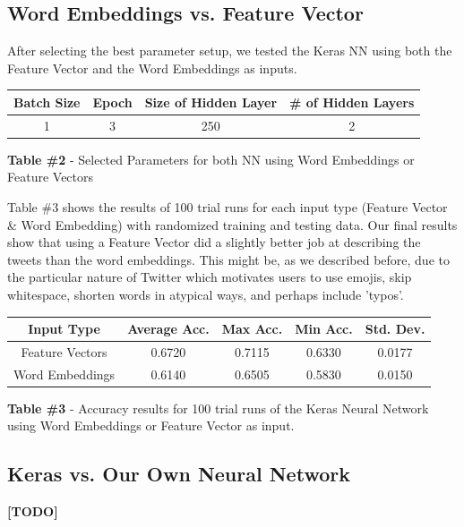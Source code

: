 \documentclass[11pt,onecolumn]{article} %
\begin{document}
\subsection{Word Embeddings vs. Feature Vector}
After selecting the best parameter setup, we tested the Keras NN using both the Feature Vector and the Word Embeddings as inputs. 

\begin{center}
	\begin{tabular}{ | c | c | c | c |}
		\hline
		Batch Size & Epoch & Size of Hidden Layer & \# of Hidden Layers \\
		\hline
		1 & 3 &  250 & 2 \\
		\hline
	\end{tabular}
	\newline
	\newline
	\textbf{Table \#2 } - Selected Parameters for both NN using Word Embeddings or Feature Vectors
\end{center}

\par Table \#3 shows the results of 100 trial runs for each input type (Feature Vector \& Word Embedding) with randomized training and testing data. Our final results show that using a Feature Vector did a slightly better job at describing the tweets than the word embeddings. This might be, as we described before, due to the particular nature of Twitter which motivates users to use emojis, skip whitespace, shorten words in atypical ways, and perhaps include 'typos'. 

\begin{center}
	\begin{tabular}{ | c | c | c | c | c |}
		\hline
		Input Type & Average Acc. & Max Acc. & Min Acc. & Std. Dev. \\
		\hline
		Feature Vectors & 0.6720 & 0.7115 & 0.6330 & 0.0177 \\
		\hline
		Word Embeddings & 0.6140 &	0.6505 & 0.5830 & 0.0150
		\\
		\hline
	\end{tabular}
	\newline
	\newline
	\textbf{Table \#3} - Accuracy results for 100 trial runs of the Keras Neural Network using Word Embeddings or Feature Vector as input.
\end{center}

\subsection{Keras vs. Our Own Neural Network}
\textbf{[TODO]}
\end{document}
